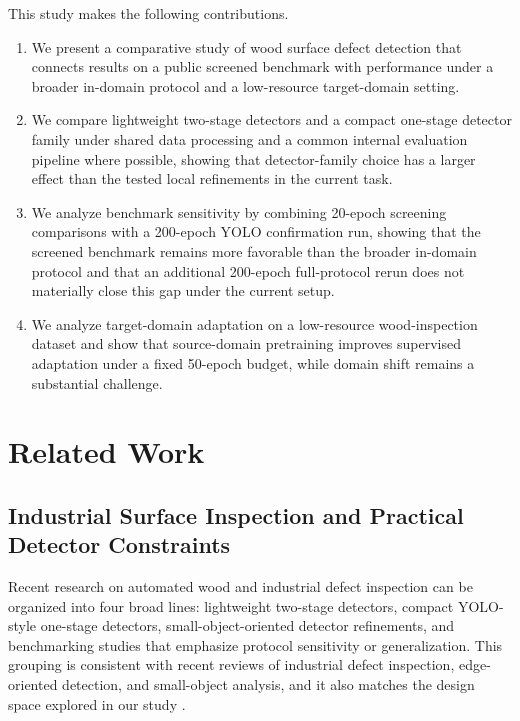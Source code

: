 This study makes the following contributions.

\begin{enumerate}[leftmargin=1.5em]
  \item We present a comparative study of wood surface defect detection that connects results on a public screened benchmark with performance under a broader in-domain protocol and a low-resource target-domain setting.
\item We compare lightweight two-stage detectors and a compact one-stage detector family under shared data processing and a common internal evaluation pipeline where possible, showing that detector-family choice has a larger effect than the tested local refinements in the current task.
\item We analyze benchmark sensitivity by combining 20-epoch screening comparisons with a 200-epoch YOLO confirmation run, showing that the screened benchmark remains more favorable than the broader in-domain protocol and that an additional 200-epoch full-protocol rerun does not materially close this gap under the current setup.
  \item We analyze target-domain adaptation on a low-resource wood-inspection dataset and show that source-domain pretraining improves supervised adaptation under a fixed 50-epoch budget, while domain shift remains a substantial challenge.
\end{enumerate}

\section{Related Work}
\label{sec:related-work}

\subsection{Industrial Surface Inspection and Practical Detector Constraints}

Recent research on automated wood and industrial defect inspection can be organized into four broad lines: lightweight two-stage detectors, compact YOLO-style one-stage detectors, small-object-oriented detector refinements, and benchmarking studies that emphasize protocol sensitivity or generalization. This grouping is consistent with recent reviews of industrial defect inspection, edge-oriented detection, and small-object analysis, and it also matches the design space explored in our study \citep{ma_2024_air,wang_2025_ieeeaccess,mittal_2024,wei_2024_smallreview,hua_2025_smallsurvey}.


